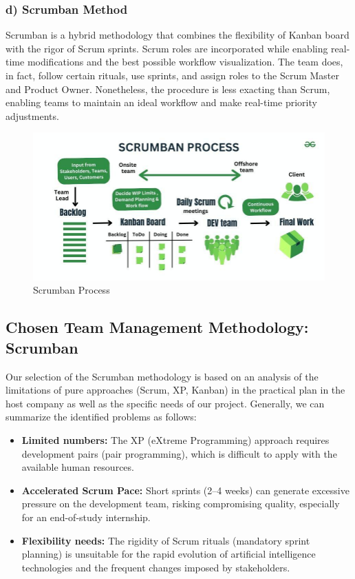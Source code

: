 \subsubsection{d) Scrumban Method}
Scrumban is a hybrid methodology that combines the flexibility of Kanban board with the rigor of Scrum sprints. Scrum roles are incorporated while enabling real-time modifications and the best possible workflow visualization. The team does, in fact, follow certain rituals, use sprints, and assign roles to the Scrum Master and Product Owner. Nonetheless, the procedure is less exacting than Scrum, enabling teams to maintain an ideal workflow and make real-time priority adjustments.

\begin{center}
\begin{figure}[H]
            \centering
            \includegraphics[scale=0.44]{images/scrumban.jpg}
            \caption{Scrumban Process }
            \label{fig:Scrumban_Process}
\end{figure}
\end{center}   


\subsection{Chosen Team Management Methodology: Scrumban}
Our selection of the Scrumban methodology is based on an analysis of the limitations of pure approaches (Scrum, XP, Kanban) in the practical plan in the host company as well as the specific needs of our project. Generally, we can summarize the identified problems as follows:
\begin{itemize}
    \item \textbf{Limited numbers:}
    The XP (eXtreme Programming) approach requires development pairs (pair programming), which is difficult to apply with the available human resources.
        
    \item \textbf{Accelerated Scrum Pace:}
    Short sprints (2–4 weeks) can generate excessive pressure on the development team, risking compromising quality, especially for an end-of-study internship.    
        
    \item \textbf{Flexibility needs:}
    The rigidity of Scrum rituals (mandatory sprint planning) is unsuitable for the rapid evolution of artificial intelligence technologies and the frequent changes imposed by stakeholders.
    \end{itemize}
    
